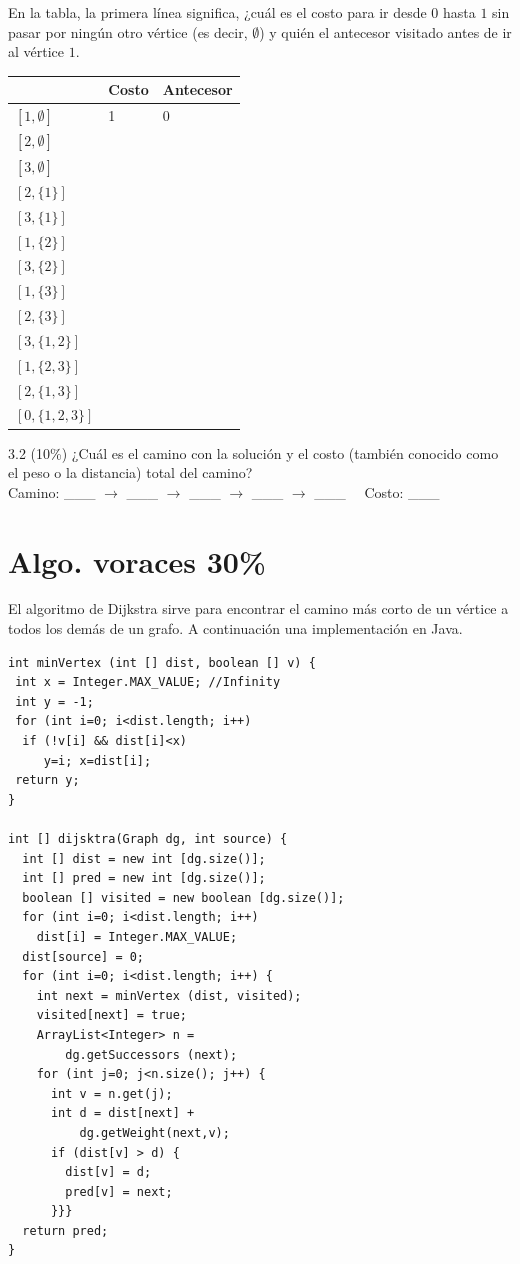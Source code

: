 \documentclass[twocolumn]{article}
\begin{document}
En la tabla, la primera línea significa, ¿cuál es el costo para ir desde $0$ hasta $1$ sin pasar por ningún otro vértice (es decir, $\emptyset$) y quién el antecesor visitado antes de ir al vértice $1$. \\

\begin{tabular}{|l|l|l|}
\hline
& Costo & Antecesor \\
\hline
$[1,\emptyset]$ & 1 & 0 \\
\hline
$[2,\emptyset]$ & &  \\
\hline
$[3,\emptyset]$ & &  \\
\hline
$[2,\{1\}]$ & &  \\
\hline
$[3,\{1\}]$ & &  \\
\hline
$[1,\{2\}]$ & &  \\
\hline
$[3,\{2\}]$ & &  \\
\hline
$[1,\{3\}]$ & &  \\
\hline
$[2,\{3\}]$ & &  \\
\hline
$[3,\{1,2\}]$ & &  \\
\hline
$[1,\{2,3\}]$ & &  \\
\hline
$[2,\{1,3\}]$ & &  \\
\hline
$[0,\{1,2,3\}]$ & &  \\
\hline
\end{tabular}

3.2 (10\%) ¿Cuál es el camino con la solución y el costo (también conocido como el peso o la distancia) total del camino?\\

Camino: \_\_\_ $\rightarrow$ \_\_\_ $\rightarrow$ \_\_\_ $\rightarrow$ \_\_\_ $\rightarrow$ \_\_\_ \ \ Costo: \_\_\_


\section{Algo. voraces 30\%}
El algoritmo de Dijkstra sirve para encontrar el camino más corto
de un vértice a todos los demás de un grafo. A continuación una
implementación en Java.

{\small
\begin{verbatim}
int minVertex (int [] dist, boolean [] v) {
 int x = Integer.MAX_VALUE; //Infinity
 int y = -1;   
 for (int i=0; i<dist.length; i++) 
  if (!v[i] && dist[i]<x) 
     y=i; x=dist[i];
 return y;
}
      
int [] dijsktra(Graph dg, int source) {
  int [] dist = new int [dg.size()]; 
  int [] pred = new int [dg.size()]; 
  boolean [] visited = new boolean [dg.size()]; 
  for (int i=0; i<dist.length; i++) 
    dist[i] = Integer.MAX_VALUE; 
  dist[source] = 0;
  for (int i=0; i<dist.length; i++) {
    int next = minVertex (dist, visited);
    visited[next] = true;
    ArrayList<Integer> n =
        dg.getSuccessors (next); 
    for (int j=0; j<n.size(); j++) {
      int v = n.get(j);
      int d = dist[next] + 
          dg.getWeight(next,v);
      if (dist[v] > d) {
        dist[v] = d;
        pred[v] = next;
      }}}
  return pred;  
}
\end{verbatim}
}
\end{document}
